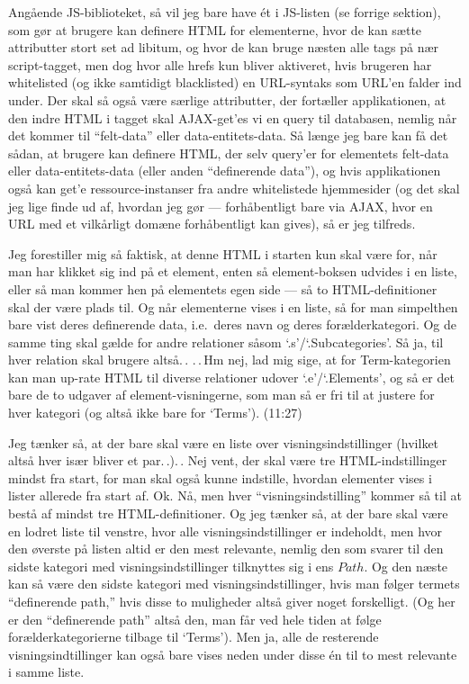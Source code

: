 \documentclass{report}
\begin{document}
Angående JS-biblioteket, så vil jeg bare have ét i JS-listen (se forrige sektion), som gør at brugere kan definere HTML for elementerne, hvor de kan sætte attributter stort set ad libitum, og hvor de kan bruge næsten alle tags på nær script-tagget, men dog hvor alle hrefs kun bliver aktiveret, hvis brugeren har whitelisted (og ikke samtidigt blacklisted) en URL-syntaks som URL'en falder ind under. Der skal så også være særlige attributter, der fortæller applikationen, at den indre HTML i tagget skal AJAX-get'es vi en query til databasen, nemlig når det kommer til ``felt-data'' eller data-entitets-data. Så længe jeg bare kan få det sådan, at brugere kan definere HTML, der selv query'er for elementets felt-data eller data-entitets-data (eller anden ``definerende data''), og hvis applikationen også kan get'e ressource-instanser fra andre whitelistede hjemmesider (og det skal jeg lige finde ud af, hvordan jeg gør --- forhåbentligt bare via AJAX, hvor en URL med et vilkårligt domæne forhåbentligt kan gives), så er jeg tilfreds. 

Jeg forestiller mig så faktisk, at denne HTML i starten kun skal være for, når man har klikket sig ind på et element, enten så element-boksen udvides i en liste, eller så man kommer hen på elementets egen side --- så to HTML-definitioner skal der være plads til. Og når elementerne vises i en liste, så for man simpelthen bare vist deres definerende data, i.e.\ deres navn og deres forælderkategori. Og de samme ting skal gælde for andre relationer såsom `.s'/`.Subcategories'. Så ja, til hver relation skal brugere altså.\,. .\,.\,Hm nej, lad mig sige, at for Term-kategorien kan man up-rate HTML til diverse relationer udover `.e'/`.Elements', og så er det bare de to udgaver af element-visningerne, som man så er fri til at justere for hver kategori (og altså ikke bare for `Terms'). (11:27)

Jeg tænker så, at der bare skal være en liste over visningsindstillinger (hvilket altså hver især bliver et par.\,.).\,. Nej vent, der skal være tre HTML-indstillinger mindst fra start, for man skal også kunne indstille, hvordan elementer vises i lister allerede fra start af. Ok. Nå, men hver ``visningsindstilling'' kommer så til at bestå af mindst tre HTML-definitioner. Og jeg tænker så, at der bare skal være en lodret liste til venstre, hvor alle visningsindstillinger er indeholdt, men hvor den øverste på listen altid er den mest relevante, nemlig den som svarer til den sidste kategori med visningsindstillinger tilknyttes sig i ens $Path$. Og den næste kan så være den sidste kategori med visningsindstillinger, hvis man følger termets ``definerende path,'' hvis disse to muligheder altså giver noget forskelligt. (Og her er den ``definerende path'' altså den, man får ved hele tiden at følge forælderkategorierne tilbage til `Terms'). Men ja, alle de resterende visningsindtillinger kan også bare vises neden under disse én til to mest relevante i samme liste. 
\end{document}
